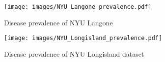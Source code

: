 \begin{figure}[!ht]
    \centering
    \texttt{[image: images/NYU\_Langone\_prevalence.pdf]}
    \caption{Disease prevalence of NYU Langone }
    \label{fig:nyu_langone_prevalence}
\end{figure}

\begin{figure}[!h]
    \centering
    \texttt{[image: images/NYU\_Longisland\_prevalence.pdf]}
    \caption{Disease prevalence of NYU Longisland dataset}
    \label{fig:nyu_longisland_prevalence}
\end{figure}
